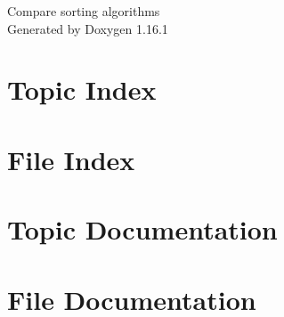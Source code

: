 \documentclass[twoside]{book}
\newcommand{\+}{\discretionary{\mbox{\scriptsize$\hookleftarrow$}}{}{}}
\newcommand{\clearemptydoublepage}{%
    \newpage{\pagestyle{empty}\cleardoublepage}%
  }
\begin{document}
  \raggedbottom
    \hypersetup{pageanchor=false,
                bookmarksnumbered=true,
                pdfencoding=unicode
               }
  \begin{titlepage}
  \vspace*{7cm}
  \begin{center}%
  {\Large Compare sorting algorithms}\\
  \vspace*{1cm}
  {\large Generated by Doxygen 1.16.1}\\
  \end{center}
  \end{titlepage}
  \clearemptydoublepage
  \tableofcontents
  \clearemptydoublepage
  \hypersetup{pageanchor=true}
\chapter{Topic Index}

\chapter{File Index}

\chapter{Topic Documentation}






\chapter{File Documentation}


  \backmatter
  \newpage
  \clearemptydoublepage
  \printindex
\end{document}
